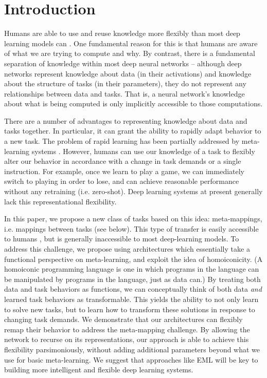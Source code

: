 \documentclass{article}
\begin{document}
\section{Introduction}
\vspace{-0.5em} %
Humans are able to use and reuse knowledge more flexibly than most deep learning models can \citep[e.g.][]{Lake2016, Marcus2018}. One fundamental reason for this is that humans are aware of what we are trying to compute and why. By contrast, there is a fundamental separation of knowledge within most deep neural networks -- although deep networks represent knowledge about data (in their activations) and knowledge about the structure of tasks (in their parameters), they do not represent any relationships between data and tasks. That is, a neural network's knowledge about what is being computed is only implicitly accessible to those computations. \par
{}
There are a number of advantages to representing knowledge about data and tasks together. In particular, it can grant the ability to rapidly adapt behavior to a new task. The problem of rapid learning has been partially addressed by meta-learning systems \citep[e.g.][see also section \ref{sec_discussion}]{Santoro2016, Finn2017a, Finn2018, Stadie2018, Botvinick2019}. However, humans can use our knowledge of a task to flexibly alter our behavior in accordance with a change in task demands or a single instruction. For example, once we learn to play a game, we can immediately switch to playing in order to lose, and can achieve reasonable performance without any retraining (i.e. zero-shot). Deep learning systems at present generally lack this representational flexibility. \par
In this paper, we propose a new class of tasks based on this idea: meta-mappings, i.e. mappings between tasks (see below). This type of transfer is easily accessible to humans \citep{Lake2016}, but is generally inaccessible to most deep-learning models. To address this challenge, we propose using architectures which essentially take a functional perspective on meta-learning, and exploit the idea of homoiconicity. (A homoiconic programming language is one in which programs in the language can be manipulated by programs in the language, just as data can.) By treating both data and task behaviors as functions, we can conceptually think of both data \emph{and} learned task behaviors as transformable. This yields the ability to not only learn to solve new tasks, but to learn how to transform these solutions in response to changing task demands. We demonstrate that our architectures can flexibly remap their behavior to address the meta-mapping challenge. By allowing the network to recurse on its representations, our approach is able to achieve this flexibility parsimoniously, without adding additional parameters beyond what we use for basic meta-learning. We suggest that approaches like EML will be key to building more intelligent and flexible deep learning systems. \par
\end{document}

